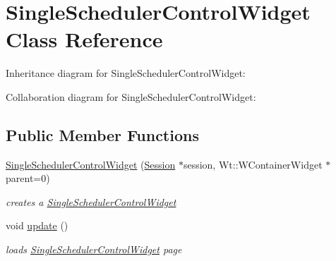 \hypertarget{classSingleSchedulerControlWidget}{}\section{Single\+Scheduler\+Control\+Widget Class Reference}
\label{classSingleSchedulerControlWidget}


Inheritance diagram for Single\+Scheduler\+Control\+Widget\+:


Collaboration diagram for Single\+Scheduler\+Control\+Widget\+:
\subsection*{Public Member Functions}
\begin{DoxyCompactItemize}
\item 
\hyperlink{classSingleSchedulerControlWidget_ac463dfb932d501b881b62d39ce40beef}{Single\+Scheduler\+Control\+Widget} (\hyperlink{classSession}{Session} $\ast$session, Wt\+::\+W\+Container\+Widget $\ast$parent=0)
\begin{DoxyCompactList}\small\item\em creates a \hyperlink{classSingleSchedulerControlWidget}{Single\+Scheduler\+Control\+Widget} \end{DoxyCompactList}\item 
void \hyperlink{classSingleSchedulerControlWidget_ad1a40c63b98309c57ec06a7d53d1fb32}{update} ()
\begin{DoxyCompactList}\small\item\em loads \hyperlink{classSingleSchedulerControlWidget}{Single\+Scheduler\+Control\+Widget} page \end{DoxyCompactList}\end{DoxyCompactItemize}
